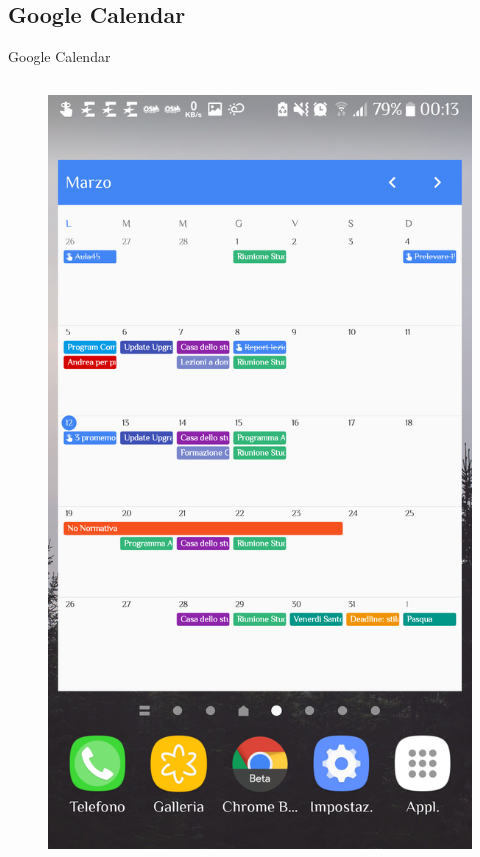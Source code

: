 \documentclass{beamer}
\begin{document}
\subsection{Google Calendar}
\begin{frame}{Google Calendar}
\begin{columns}
\begin{column}{0.5\linewidth}
\begin{figure}[h!]
\includegraphics[height=0.8\textheight]{immagini/calendar.png}

\end{figure}
\end{column}
\end{columns}
\end{frame}
\end{document}
